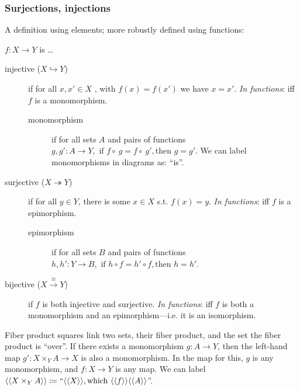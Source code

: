 \documentclass{article}
\begin{document}
\subsubsection{Surjections, injections}
A definition using elements; more robustly defined using functions:
\begin{center}
$f: X \rightarrow Y$ is \ldots
\end{center}
\begin{description}
\item[injective ($X \hookrightarrow Y$)] if for all $x,x' \in X$ , with $f(x) = f(x')$ we have $x = x'$. 
\quad \emph{In functions}: iff $f$ is a monomorphism.
\begin{description}
\item[monomorphism] if for all sets $A$ and pairs of functions $g,g': A \rightarrow Y, \text{ if } f \circ\ g = f \circ\ g', \text{then } g = g'$.
We can label monomorphisms in diagrams as: ``is''.
\end{description}
\item[surjective ($X \twoheadrightarrow Y$)] if for all $y \in Y$, there is some $x \in X$ s.t. $f(x) = y$.
\quad \emph{In functions}: iff $f$ is a epimorphism.
\begin{description}
\item[epimorphism] if for all sets $B$ and pairs of functions $h,h': Y\rightarrow B,\text{ if } h \circ f = h' \circ f, \text{then } h = h'$.
\end{description}
\item[bijective ($X \stackrel{\cong}{\longrightarrow} Y$)] if $f$ is both injective and surjective.
\quad \emph{In functions}: iff $f$ is both a monomorphism and an epimorphism---i.e. it is an isomorphism.
\end{description}

Fiber product squares link two sets, their fiber product, and the set the fiber product is ``over''. If there exists a monomorphism $g: A \rightarrow Y$, then the left-hand map $g': X \times_Y A \rightarrow X$ is also a monomorphism. 
In the map for this, $g$ is any monomorphism, and $f: X \rightarrow Y$ is any map. 
We can label $\langle\langle X \times_Y A \rangle\rangle \coloneqq ``\langle\langle X \rangle\rangle, \text{which } \langle\langle f \rangle\rangle \langle\langle A \rangle\rangle$''.
\end{document}

